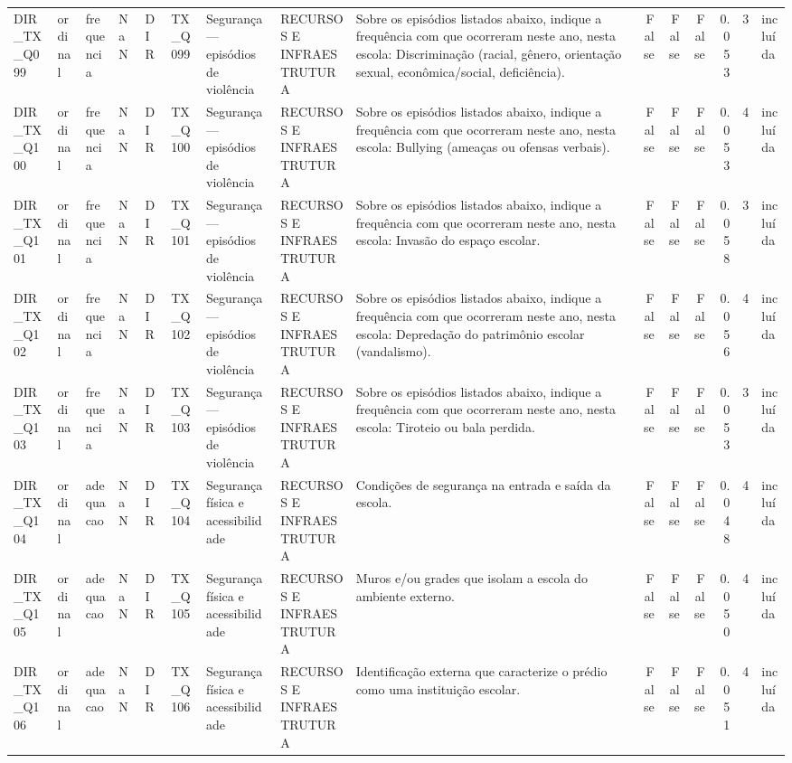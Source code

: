 \begin{tabular}{lllllllllrrrrrl}
DIR\_TX\_Q099 & ordinal & frequencia & NaN & DIR & TX\_Q099 & Segurança — episódios de violência & RECURSOS E INFRAESTRUTURA & Sobre os episódios listados abaixo, indique a frequência com que ocorreram neste ano, nesta escola: Discriminação (racial, gênero, orientação sexual, econômica/social, deficiência). & False & False & False & 0.053 & 3 & incluída \\
DIR\_TX\_Q100 & ordinal & frequencia & NaN & DIR & TX\_Q100 & Segurança — episódios de violência & RECURSOS E INFRAESTRUTURA & Sobre os episódios listados abaixo, indique a frequência com que ocorreram neste ano, nesta escola: Bullying (ameaças ou ofensas verbais). & False & False & False & 0.053 & 4 & incluída \\
DIR\_TX\_Q101 & ordinal & frequencia & NaN & DIR & TX\_Q101 & Segurança — episódios de violência & RECURSOS E INFRAESTRUTURA & Sobre os episódios listados abaixo, indique a frequência com que ocorreram neste ano, nesta escola: Invasão do espaço escolar. & False & False & False & 0.058 & 3 & incluída \\
DIR\_TX\_Q102 & ordinal & frequencia & NaN & DIR & TX\_Q102 & Segurança — episódios de violência & RECURSOS E INFRAESTRUTURA & Sobre os episódios listados abaixo, indique a frequência com que ocorreram neste ano, nesta escola: Depredação do patrimônio escolar (vandalismo). & False & False & False & 0.056 & 4 & incluída \\
DIR\_TX\_Q103 & ordinal & frequencia & NaN & DIR & TX\_Q103 & Segurança — episódios de violência & RECURSOS E INFRAESTRUTURA & Sobre os episódios listados abaixo, indique a frequência com que ocorreram neste ano, nesta escola: Tiroteio ou bala perdida. & False & False & False & 0.053 & 3 & incluída \\
DIR\_TX\_Q104 & ordinal & adequacao & NaN & DIR & TX\_Q104 & Segurança física e acessibilidade & RECURSOS E INFRAESTRUTURA & Condições de segurança na entrada e saída da escola. & False & False & False & 0.048 & 4 & incluída \\
DIR\_TX\_Q105 & ordinal & adequacao & NaN & DIR & TX\_Q105 & Segurança física e acessibilidade & RECURSOS E INFRAESTRUTURA & Muros e/ou grades que isolam a escola do ambiente externo. & False & False & False & 0.050 & 4 & incluída \\
DIR\_TX\_Q106 & ordinal & adequacao & NaN & DIR & TX\_Q106 & Segurança física e acessibilidade & RECURSOS E INFRAESTRUTURA & Identificação externa que caracterize o prédio como uma instituição escolar. & False & False & False & 0.051 & 4 & incluída \\

\end{tabular}
